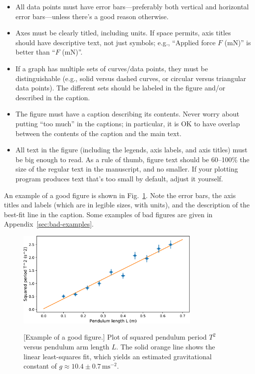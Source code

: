 \documentclass[11pt,a4paper]{article}
\begin{document}
\begin{itemize}
\item All data points must have error bars---preferably both vertical
  and horizontal error bars---unless there's a good reason otherwise.

\item Axes must be clearly titled, including units.  If space permits,
  axis titles should have descriptive text, not just symbols; e.g.,
  ``Applied force $F$ (mN)'' is better than ``$F$ (mN)''.

\item If a graph has multiple sets of curves/data points, they must be
  distinguishable (e.g., solid versus dashed curves, or circular
  versus triangular data points).  The different sets should be
  labeled in the figure and/or described in the caption.

\item The figure must have a caption describing its contents.  Never
  worry about putting ``too much'' in the captions; in particular, it
  is OK to have overlap between the contents of the caption and the
  main text.

\item
  All text in the figure (including the legends, axis labels, and axis
  titles) must be big enough to read.  As a rule of thumb, figure text
  should be 60--100\% the size of the regular text in the manuscript,
  and no smaller.  If your plotting program produces text that's too
  small by default, adjust it yourself.
\end{itemize}
\noindent
An example of a good figure is shown in Fig.~\ref{pendulum-figure-1}.
Note the error bars, the axis titles and labels (which are in legible
sizes, with units), and the description of the best-fit line in the
caption.  Some examples of bad figures are given in
Appendix~\ref{sec:bad-examples}.

\begin{figure}[h]
  \centering
  \includegraphics[width=0.8\textwidth]{pendulum-figure-1.pdf} \\
  \caption{\small [Example of a good figure.]  Plot of squared
    pendulum period $T^2$ versus pendulum arm length $L$.  The solid
    orange line shows the linear least-squares fit, which yields an
    estimated gravitational constant of $g \approx 10.4 \pm
    0.7\,\textrm{ms}^{-2}$.}
  \label{pendulum-figure-1}
\end{figure}
\end{document}
